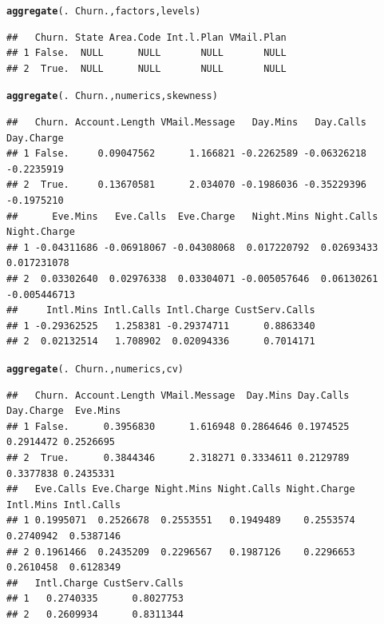 \documentclass{article}\usepackage[]{graphicx}\usepackage[]{color}
\makeatletter
\newcommand{\hlopt}[1]{\textcolor[rgb]{0,0,0}{#1}}%
\newcommand{\hlstd}[1]{\textcolor[rgb]{0.345,0.345,0.345}{#1}}%
\newcommand{\hlkwd}[1]{\textcolor[rgb]{0.737,0.353,0.396}{\textbf{#1}}}%
\newenvironment{kframe}{%
 \def\at@end@of@kframe{}%
 \ifinner\ifhmode%
  \def\at@end@of@kframe{\end{minipage}}%
  \begin{minipage}{\columnwidth}%
 \fi\fi%
 \def\FrameCommand##1{\hskip\@totalleftmargin \hskip-\fboxsep
 \colorbox{shadecolor}{##1}\hskip-\fboxsep
     \hskip-\linewidth \hskip-\@totalleftmargin \hskip\columnwidth}%
 \MakeFramed {\advance\hsize-\width
   \@totalleftmargin\z@ \linewidth\hsize
   \@setminipage}}%
 {\par\unskip\endMakeFramed%
 \at@end@of@kframe}
\newenvironment{knitrout}{}{} %
\makeatother
\begin{document}
\begin{description}
\begin{knitrout}
\color{fgcolor}\begin{kframe}
\begin{alltt}
\hlkwd{aggregate}\hlstd{(.} \hlopt{~} \hlstd{Churn., factors, levels)}
\end{alltt}
\begin{verbatim}
##   Churn. State Area.Code Int.l.Plan VMail.Plan
## 1 False.  NULL      NULL       NULL       NULL
## 2  True.  NULL      NULL       NULL       NULL
\end{verbatim}
\end{kframe}
\end{knitrout}

\begin{knitrout}
\color{fgcolor}\begin{kframe}
\begin{alltt}
\hlkwd{aggregate}\hlstd{(.} \hlopt{~} \hlstd{Churn., numerics, skewness)}
\end{alltt}
\begin{verbatim}
##   Churn. Account.Length VMail.Message   Day.Mins   Day.Calls Day.Charge
## 1 False.     0.09047562      1.166821 -0.2262589 -0.06326218 -0.2235919
## 2  True.     0.13670581      2.034070 -0.1986036 -0.35229396 -0.1975210
##      Eve.Mins   Eve.Calls  Eve.Charge   Night.Mins Night.Calls Night.Charge
## 1 -0.04311686 -0.06918067 -0.04308068  0.017220792  0.02693433  0.017231078
## 2  0.03302640  0.02976338  0.03304071 -0.005057646  0.06130261 -0.005446713
##     Intl.Mins Intl.Calls Intl.Charge CustServ.Calls
## 1 -0.29362525   1.258381 -0.29374711      0.8863340
## 2  0.02132514   1.708902  0.02094336      0.7014171
\end{verbatim}
\end{kframe}
\end{knitrout}

\begin{knitrout}
\color{fgcolor}\begin{kframe}
\begin{alltt}
\hlkwd{aggregate}\hlstd{(.} \hlopt{~} \hlstd{Churn., numerics, cv)}
\end{alltt}
\begin{verbatim}
##   Churn. Account.Length VMail.Message  Day.Mins Day.Calls Day.Charge  Eve.Mins
## 1 False.      0.3956830      1.616948 0.2864646 0.1974525  0.2914472 0.2526695
## 2  True.      0.3844346      2.318271 0.3334611 0.2129789  0.3377838 0.2435331
##   Eve.Calls Eve.Charge Night.Mins Night.Calls Night.Charge Intl.Mins Intl.Calls
## 1 0.1995071  0.2526678  0.2553551   0.1949489    0.2553574 0.2740942  0.5387146
## 2 0.1961466  0.2435209  0.2296567   0.1987126    0.2296653 0.2610458  0.6128349
##   Intl.Charge CustServ.Calls
## 1   0.2740335      0.8027753
## 2   0.2609934      0.8311344
\end{verbatim}
\end{kframe}
\end{knitrout}


\end{description}
\end{document}
